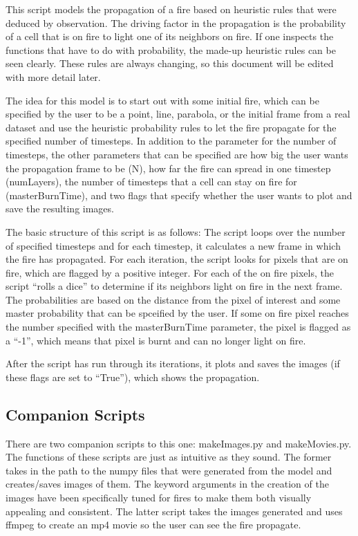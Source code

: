 \documentclass{article}
\begin{document}
This script models the propagation of a fire based on
heuristic rules that were deduced by observation. The
driving factor in the propagation is the probability of
a cell that is on fire to light one of its neighbors on
fire. If one inspects the functions that have to do with
probability, the made-up heuristic rules can be seen
clearly. These rules are always changing, so this document
will be edited with more detail later.
\par
The idea for this model is to start out with some initial
fire, which can be specified by the user to be a point, line,
parabola, or the initial frame from a real dataset and use
the heuristic probability rules to let the fire propagate for
the specified number of timesteps. In addition to the parameter
for the number of timesteps, the other parameters that can be
specified are how big the user wants the propagation frame to be
(N), how far the fire can spread in one timestep (numLayers), the
number of timesteps that a cell can stay on fire for (masterBurnTime),
and two flags that specify whether the user wants to plot
and save the resulting images.
\par
The basic structure of this script is as follows: The script loops
over the number of specified timesteps and for each timestep, it
calculates a new frame in which the fire has propagated.
For each iteration, the script looks for pixels that are on fire,
which are flagged by a positive integer. For each of the on fire
pixels, the script ``rolls a dice'' to determine if its neighbors
light on fire in the next frame. The probabilities are based on the
distance from the pixel of interest and some master probability that
can be spceified by the user. If some on fire pixel reaches the number
specified with the masterBurnTime parameter, the pixel is flagged as
a ``-1'', which means that pixel is burnt and can no longer
light on fire.
\par
After the script has run through its iterations, it plots and saves
the images (if these flags are set to ``True''), which shows
the propagation.

\subsection{Companion Scripts}
There are two companion scripts to this one: makeImages.py and makeMovies.py. The functions of these scripts are just as intuitive as they sound. The former takes in the path to the numpy files that were generated from the model and creates/saves images of them. The keyword arguments in the creation of the images have been specifically tuned for fires to make them both visually appealing and consistent. The latter script takes the images generated and uses ffmpeg to create an mp4 movie so the user can see the fire propagate. 
\end{document}
